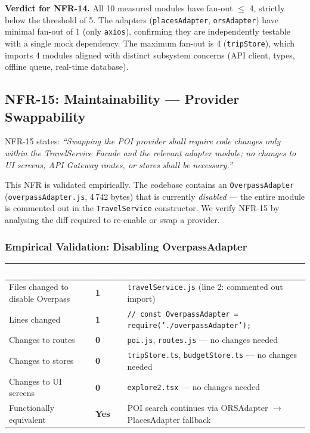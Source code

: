 \documentclass[12pt, a4paper]{article}
\newcommand{\thcell}[1]{\textcolor{white}{\textbf{\small #1}}}
\newcommand{\code}[1]{\texttt{\small #1}}
\newcommand{\reqid}[1]{\textsc{\small #1}}
\begin{document}
\begin{tcolorbox}[notebox]
  \textbf{Verdict for NFR-14.} All 10 measured modules have fan-out $\leq$ 4, strictly below the threshold of 5. The adapters (\code{placesAdapter}, \code{orsAdapter}) have minimal fan-out of 1 (only \code{axios}), confirming they are independently testable with a single mock dependency. The maximum fan-out is 4 (\code{tripStore}), which imports 4 modules aligned with distinct subsystem concerns (API client, types, offline queue, real-time database).
\end{tcolorbox}

\subsection{NFR-15: Maintainability --- Provider Swappability}

\reqid{NFR-15} states: \emph{``Swapping the POI provider shall require code changes only within the TravelService Facade and the relevant adapter module; no changes to UI screens, API Gateway routes, or stores shall be necessary.''}

This NFR is validated empirically. The codebase contains an \code{OverpassAdapter} (\code{overpassAdapter.js}, 4\,742 bytes) that is currently \emph{disabled} --- the entire module is commented out in the \code{TravelService} constructor. We verify NFR-15 by analysing the diff required to re-enable or swap a provider.

\subsubsection{Empirical Validation: Disabling OverpassAdapter}

\begin{longtable}{L{3.5cm} C{3.0cm} L{6.5cm}}
\toprule
{}
\thcell{Metric} & \thcell{Value} & \thcell{Evidence} \\
\midrule
\endhead
\bottomrule
\endfoot

Files changed to disable Overpass & \textbf{1} & \code{travelService.js} (line 2: commented out import) \\
Lines changed & \textbf{1} & \code{// const OverpassAdapter = require('./overpassAdapter');} \\
Changes to routes & \textbf{0} & \code{poi.js}, \code{routes.js} --- no changes needed \\
Changes to stores & \textbf{0} & \code{tripStore.ts}, \code{budgetStore.ts} --- no changes needed \\
Changes to UI screens & \textbf{0} & \code{explore2.tsx} --- no changes needed \\
Functionally equivalent & \textbf{Yes} & POI search continues via ORSAdapter $\to$ PlacesAdapter fallback \\
\end{longtable}
\end{document}
